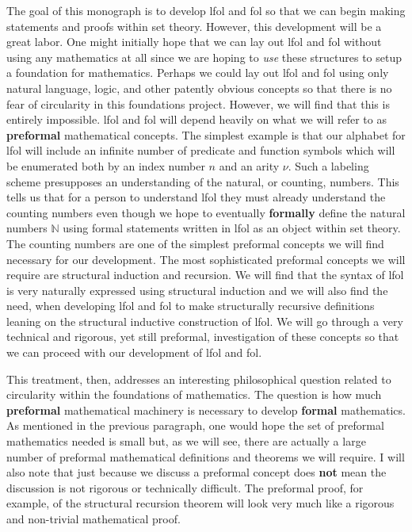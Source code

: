 \documentclass[oneside, 12pt]{book}
\theoremstyle{break}
\newtheorem{preformal definition}[definition]{Preformal Definition}
\newtheorem{preformal theorem}[theorem]{Preformal Theorem}
\newcommand{\N}[0]{\mathbb{N}}
\begin{document}
			The goal of this monograph is to develop \gls{lfol} and \gls{fol} so that we can begin making statements and proofs within set theory.
			However, this development will be a great labor.
			One might initially hope that we can lay out \gls{lfol} and \gls{fol} without using any mathematics at all since we are hoping to \textit{use} these structures to setup a foundation for mathematics.
			Perhaps we could lay out \gls{lfol} and \gls{fol} using only natural language, logic, and other patently obvious concepts so that there is no fear of circularity in this foundations project.
			However, we will find that this is entirely impossible.
			\gls{lfol} and \gls{fol} will depend heavily on what we will refer to as \textbf{preformal} mathematical concepts.
			The simplest example is that our alphabet for \gls{lfol} will include an infinite number of predicate and function symbols which will be enumerated both by an index number $n$ and an arity $\nu$.
			Such a labeling scheme presupposes an understanding of the natural, or counting, numbers.
			This tells us that for a person to understand \gls{lfol} they must already understand the counting numbers even though we hope to eventually \textbf{formally} define the natural numbers $\N$ using formal statements written in \gls{lfol} as an object within set theory.
			The counting numbers are one of the simplest preformal concepts we will find necessary for our development. 
			The  most sophisticated preformal concepts we will require are structural induction and recursion.
			We will find that the syntax of \gls{lfol} is very naturally expressed using structural induction and we will also find the need, when developing \gls{lfol} and \gls{fol} to make structurally recursive definitions leaning on the structural inductive construction of \gls{lfol}.
			We will go through a very technical and rigorous, yet still preformal, investigation of these concepts so that we can proceed with our development of \gls{lfol} and \gls{fol}.
			
			This treatment, then, addresses an interesting philosophical question related to circularity within the foundations of mathematics.
			The question is how much \textbf{preformal} mathematical machinery is necessary to develop \textbf{formal} mathematics.
			As mentioned in the previous paragraph, one would hope the set of preformal mathematics needed is small but, as we will see, there are actually a large number of preformal mathematical definitions and theorems we will require.
			I will also note that just because we discuss a preformal concept does \textbf{not} mean the discussion is not rigorous or technically difficult. 
			The preformal proof, for example, of the structural recursion theorem will look very much like a rigorous and non-trivial mathematical proof.
			
\end{document}
